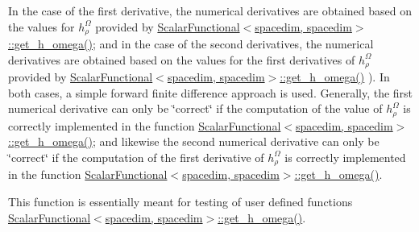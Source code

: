 In the case of the first derivative, the numerical derivatives are obtained based on the values for $h^\Omega_\rho$ provided by \hyperlink{class_scalar_functional_3_01spacedim_00_01spacedim_01_4_a629bfeae4d8ea364fc3f72fea8016ac8}{Scalar\+Functional$<$spacedim, spacedim$>$\+::get\+\_\+h\+\_\+omega()}; and in the case of the second derivatives, the numerical derivatives are obtained based on the values for the first derivatives of $h^\Omega_\rho$ provided by \hyperlink{class_scalar_functional_3_01spacedim_00_01spacedim_01_4_a629bfeae4d8ea364fc3f72fea8016ac8}{Scalar\+Functional$<$spacedim, spacedim$>$\+::get\+\_\+h\+\_\+omega()} ). In both cases, a simple forward finite difference approach is used. Generally, the first numerical derivative can only be \char`\"{}correct\char`\"{} if the computation of the value of $h^\Omega_\rho$ is correctly implemented in the function \hyperlink{class_scalar_functional_3_01spacedim_00_01spacedim_01_4_a629bfeae4d8ea364fc3f72fea8016ac8}{Scalar\+Functional$<$spacedim, spacedim$>$\+::get\+\_\+h\+\_\+omega()}; and likewise the second numerical derivative can only be \char`\"{}correct\char`\"{} if the computation of the first derivative of $h^\Omega_\rho$ is correctly implemented in the function \hyperlink{class_scalar_functional_3_01spacedim_00_01spacedim_01_4_a629bfeae4d8ea364fc3f72fea8016ac8}{Scalar\+Functional$<$spacedim, spacedim$>$\+::get\+\_\+h\+\_\+omega()}.

This function is essentially meant for testing of user defined functions \hyperlink{class_scalar_functional_3_01spacedim_00_01spacedim_01_4_a629bfeae4d8ea364fc3f72fea8016ac8}{Scalar\+Functional$<$spacedim, spacedim$>$\+::get\+\_\+h\+\_\+omega()}.


